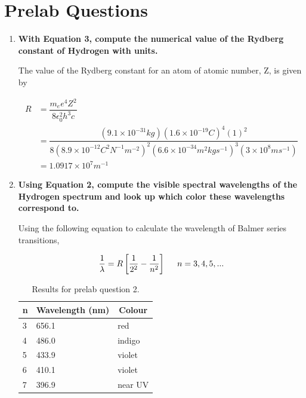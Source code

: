 \section{Prelab Questions}
\begin{enumerate}

\item {\bf With Equation 3, compute the numerical value of the Rydberg constant of Hydrogen with units.}\newline

The value of the Rydberg constant for an atom of atomic number, Z, is given by

\small
\begin{align}
R&=\dfrac{m_ee^4Z^2}{8\epsilon_0^2h^3c}\\
&=\dfrac{(9.1\times10^{-31}kg)(1.6\times10^{-19}C)^4(1)^2}{8(8.9\times10^{-12}C^2N^{-1}m^{-2})^2(6.6\times10^{-34}m^2kgs^{-1})^3(3\times10^8ms^{-1})}\\
&=1.0917\times10^{7}m^{-1}
\label{equ:spcg1}
\end{align}
\normalsize

\item {\bf Using Equation 2, compute the visible spectral wavelengths of the Hydrogen spectrum and look up which color these wavelengths correspond to.}\newline

Using the following equation to calculate the wavelength of Balmer series transitions,

\begin{equation}
\dfrac{1}{\lambda}=R\left[\dfrac{1}{2^2}-\dfrac{1}{n^2}\right] \hspace{5mm}n=3,4,5,...
\label{equ:spcg2}
\end{equation}

\begin{table}[ht]
\center
\begin{tabular}{|l|l|l|}
\hline
\multicolumn{1}{|c|}{n} & \multicolumn{1}{c|}{Wavelength (nm)} & \multicolumn{1}{c|}{Colour} \\ \hline
3                       & 656.1                                & red                         \\ \hline
4                       & 486.0                                & indigo                      \\ \hline
5                       & 433.9                                & violet                      \\ \hline
6                       & 410.1                                & violet                      \\ \hline
7                       & 396.9                                & near UV                     \\ \hline
\end{tabular}
\caption{Results for prelab question 2.}
\label{tab:spcg1}
\end{table}


\end{enumerate}
